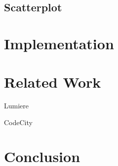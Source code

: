 \documentclass[runningheads]{llncs}
\newcommand{\seclabel}[1]{\label{sec:#1}}
\begin{document}
\subsection{Scatterplot}


\section{Implementation} \seclabel{implementation}

\section{Related Work} \seclabel{relatedwork}

Lumiere~\cite{Oliv09a}

CodeCity~\cite{Wett08d}

\section{Conclusion} \seclabel{conclusion}



%



\end{document}

